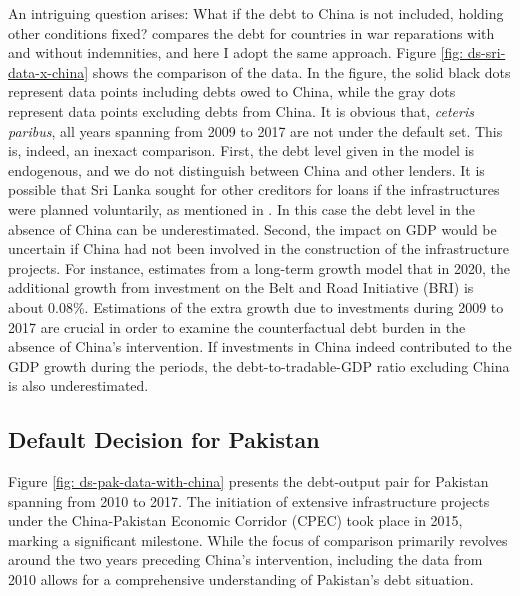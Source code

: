 An intriguing question arises: What if the debt to China is not included, holding other conditions fixed? \citet{Hinrichsen_2020-chapter4} compares the debt for countries in war reparations with and without indemnities, and here I adopt the same approach. Figure \ref{fig: ds-sri-data-x-china} shows the comparison of the data. In the figure, the solid black dots represent data points including debts owed to China, while the gray dots represent data points excluding debts from China.
It is obvious that, \emph{ceteris paribus}, all years spanning from 2009 to 2017 are not under the default set. This is, indeed, an inexact comparison.
First, the debt level given in the model is endogenous, and we do not distinguish between China and other lenders. It is possible that Sri Lanka sought for other creditors for loans if the infrastructures were planned voluntarily, as mentioned in \citet{Brautigam-meme-2020}. In this case the debt level in the absence of China can be underestimated.
Second, the impact on GDP would be uncertain if China had not been involved in the construction of the infrastructure projects. For instance, \citet{Bandiera-Vasileios-BRI-debt} estimates from a long-term growth model that in 2020, the additional growth from investment on the Belt and Road Initiative (BRI) is about 0.08\%.
Estimations of the extra growth due to investments during 2009 to 2017 are crucial in order to examine the counterfactual debt burden in the absence of China's intervention. If investments in China indeed contributed to the GDP growth during the periods, the debt-to-tradable-GDP ratio excluding China is also underestimated.

\subsection{Default Decision for Pakistan}

Figure \ref{fig: ds-pak-data-with-china} presents the debt-output pair for Pakistan spanning from 2010 to 2017. The initiation of extensive infrastructure projects under the China-Pakistan Economic Corridor (CPEC) took place in 2015, marking a significant milestone. While the focus of comparison primarily revolves around the two years preceding China's intervention, including the data from 2010 allows for a comprehensive understanding of Pakistan's debt situation.

